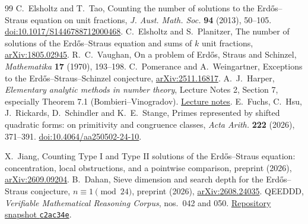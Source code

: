 \documentclass[a4paper,11pt]{article}
\newcommand{\arxiv}[1]{\href{https://arxiv.org/abs/#1}{arXiv:#1}}
\begin{document}
\begin{thebibliography}{99}\small
{} C.~Elsholtz and T.~Tao, Counting the number of solutions to the Erd\H os--Straus equation on unit fractions, \emph{J. Aust. Math. Soc.} \textbf{94} (2013), 50--105. \href{https://doi.org/10.1017/S1446788712000468}{doi:10.1017/S1446788712000468}.
 C.~Elsholtz and S.~Planitzer, The number of solutions of the Erd\H os--Straus equation and sums of $k$ unit fractions, \arxiv{1805.02945}.
 R.~C.~Vaughan, On a problem of Erd\H os, Straus and Schinzel, \emph{Mathematika} \textbf{17} (1970), 193--198.
 C.~Pomerance and A.~Weingartner, Exceptions to the Erd\H os--Straus--Schinzel conjecture, \arxiv{2511.16817}.
 A.~J.~Harper, \emph{Elementary analytic methods in number theory}, Lecture Notes 2, Section 7, especially Theorem 7.1 (Bombieri--Vinogradov). \href{https://warwick.ac.uk/fac/sci/maths/people/staff/harper/elementarymethodsnotes2.pdf}{Lecture notes}.
 E.~Fuchs, C.~Hsu, J.~Rickards, D.~Schindler and K.~E.~Stange, Primes represented by shifted quadratic forms: on primitivity and congruence classes, \emph{Acta Arith.} \textbf{222} (2026), 371--391. \href{https://doi.org/10.4064/aa250502-24-10}{doi:10.4064/aa250502-24-10}.

 X.~Jiang, Counting Type I and Type II solutions of the Erd\H os--Straus equation: concentration, local obstructions, and a pointwise comparison, preprint (2026), \arxiv{2609.09204}.
 B.~Dahan, Sieve dimension and search depth for the Erd\H os--Straus conjecture, $n\equiv1\pmod{24}$, preprint (2026), \arxiv{2608.24035}.
 QEEDDD, \emph{Verifiable Mathematical Reasoning Corpus}, nos.~042 and 050.
\href{https://github.com/QEEDDD/Verifiable-Mathematical-Reasoning-Corpus/tree/c2ac34ea4622778187173f41bb1996deee8081b7}{Repository snapshot \texttt{c2ac34e}}.
\end{thebibliography}
\end{document}
